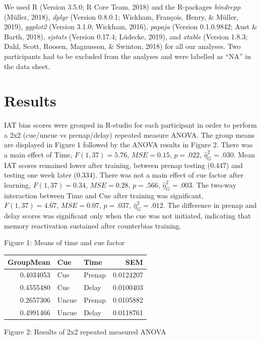 \documentclass[man,floatsintext]{apa6}
\begin{document}
We used R (Version 3.5.0; R Core Team, 2018) and the R-packages
\emph{bindrcpp} (Müller, 2018), \emph{dplyr} (Version 0.8.0.1; Wickham,
François, Henry, \& Müller, 2019), \emph{ggplot2} (Version 3.1.0;
Wickham, 2016), \emph{papaja} (Version 0.1.0.9842; Aust \& Barth, 2018),
\emph{sjstats} (Version 0.17.4; Lüdecke, 2019), and \emph{xtable}
(Version 1.8.3; Dahl, Scott, Roosen, Magnusson, \& Swinton, 2018) for
all our analyses. Two participants had to be excluded from the analyses
and were labelled as \enquote{NA} in the data sheet.

\section{Results}\label{results}

IAT bias scores were grouped in R-studio for each participant in order
to perform a 2x2 (cue/uncue vs prenap/delay) repeated measure ANOVA. The
group means are displayed in Figure 1 followed by the ANOVA results in
Figure 2. There was a main effect of Time, \(F(1, 37) = 5.76\),
\(\mathit{MSE} = 0.15\), \(p = .022\), \(\hat{\eta}^2_G = .030\). Mean
IAT scores remained lower after training, between prenap testing (0.447)
and testing one week later (0.334). There was not a main effect of cue
factor after learning, \(F(1, 37) = 0.34\), \(\mathit{MSE} = 0.28\),
\(p = .566\), \(\hat{\eta}^2_G = .003\). The two-way interaction between
Time and Cue after training was significant, \(F(1, 37) = 4.67\),
\(\mathit{MSE} = 0.07\), \(p = .037\), \(\hat{\eta}^2_G = .012\). The
difference in prenap and delay scores was significant only when the cue
was not initiated, indicating that memory reactivation sustained after
counterbias training.

Figure 1: Means of time and cue factor

\begin{tabular}{r|l|l|r}
\hline
GroupMean & Cue & Time & SEM\\
\hline
0.4034053 & Cue & Prenap & 0.0124207\\
\hline
0.4555480 & Cue & Delay & 0.0100403\\
\hline
0.2657306 & Uncue & Prenap & 0.0105882\\
\hline
0.4991466 & Uncue & Delay & 0.0118761\\
\hline
\end{tabular}

Figure 2: Results of 2x2 repeated measured ANOVA
\end{document}
